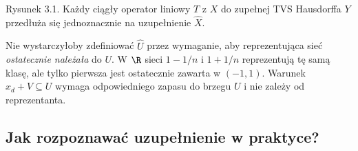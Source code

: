 \begin{center}

{\small Rysunek 3.1. Każdy ciągły operator liniowy $T$ z $X$
do zupełnej TVS Hausdorffa $Y$ przedłuża się jednoznacznie
na uzupełnienie $\widehat X$.}
\end{center}

\begin{uwaga}
Nie wystarczyłoby zdefiniować $\widehat U$ przez wymaganie,
aby reprezentująca sieć \emph{ostatecznie należała} do $U$.
W $\R$ sieci $1-1/n$ i $1+1/n$ reprezentują tę samą klasę,
ale tylko pierwsza jest ostatecznie zawarta w $(-1,1)$.
Warunek $x_d+V\subseteq U$ wymaga odpowiedniego zapasu
do brzegu $U$ i nie zależy od reprezentanta.
\end{uwaga}

\subsection{Jak rozpoznawać uzupełnienie w praktyce?}

